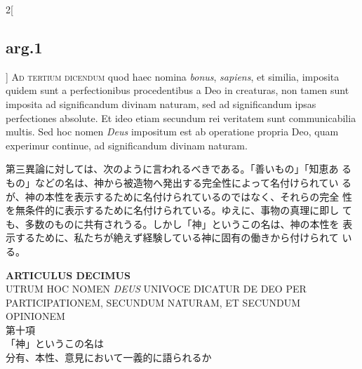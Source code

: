 \documentclass[paper=a4paper,fontsize=10pt,jafontsize=9pt,titlepage]{jlreq}
\begin{document}
\begin{paracol}{2}[\subsection{arg.1}]
{\scshape Ad tertium dicendum} quod haec nomina {\itshape bonus},
{\itshape sapiens}, et similia, imposita quidem sunt a perfectionibus
procedentibus a Deo in creaturas, non tamen sunt imposita ad
significandum divinam naturam, sed ad significandum ipsas perfectiones
absolute. Et ideo etiam secundum rei veritatem sunt communicabilia
multis. Sed hoc nomen {\itshape Deus} impositum est ab operatione
propria Deo, quam experimur continue, ad significandum divinam
naturam.

\switchcolumn

第三異論に対しては、次のように言われるべきである。「善いもの」「知恵あ
るもの」などの名は、神から被造物へ発出する完全性によって名付けられてい
るが、神の本性を表示するために名付けられているのではなく、それらの完全
性を無条件的に表示するために名付けられている。ゆえに、事物の真理に即し
ても、多数のものに共有されうる。しかし「神」というこの名は、神の本性を
表示するために、私たちが絶えず経験している神に固有の働きから付けられて
いる。

\end{paracol}
\newpage
{}

\begin{center}
{\Large {\bfseries ARTICULUS DECIMUS}}\\
{\large UTRUM HOC NOMEN {\itshape DEUS} UNIVOCE DICATUR DE DEO PER
PARTICIPATIONEM, SECUNDUM NATURAM, ET SECUNDUM OPINIONEM}\\
{\Large 第十項\\「神」というこの名は\\分有、本性、意見において一義的に語られるか}
\end{center}

{}
\setcounter{section}{10}
\setcounter{subsection}{0}
\end{document}
